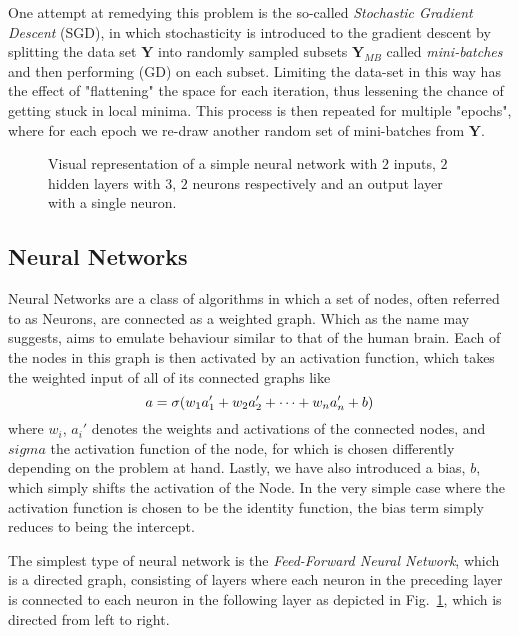 \documentclass[reprint, english, nofootinbib]{revtex4-2}
\begin{document}
One attempt at remedying this problem is the so-called \textit{Stochastic Gradient Descent} (SGD), in which stochasticity is introduced to the gradient descent by splitting the data set $\pmb Y$ into randomly sampled subsets $\pmb Y_{MB}$ called \textit{mini-batches} and then performing (GD) on each subset. Limiting the data-set in this way has the effect of "flattening" the space for each iteration, thus lessening the chance of getting stuck in local minima. This process is then repeated for multiple "epochs", where for each epoch we re-draw another random set of mini-batches from $\pmb Y$.



\begin{figure}[h!tb]
    \center
    \vspace{5mm} %
    
    \caption{\label{fig: NN Fig} Visual representation of a simple neural network with $2$ inputs, $2$ hidden layers with $3$, $2$ neurons respectively and an output layer with a single neuron.}
\end{figure}

\subsection{Neural Networks}
\noindent
Neural Networks are a class of algorithms in which a set of nodes, often referred to as Neurons, are connected as a weighted graph. Which as the name may suggests, aims to emulate behaviour similar to that of the human brain. Each of the nodes in this graph is then activated by an activation function, which takes the weighted input of all of its connected graphs like
\begin{equation}
    a = \sigma\qty(w_1 a_1' + w_2 a_2' + \dots + w_n a_n' + b)
\end{equation}
where $w_i$, $a_i'$ denotes the weights and activations of the connected nodes, and $sigma$ the activation function of the node, for which is chosen differently depending on the problem at hand. Lastly, we have also introduced a bias, $b$, which simply shifts the activation of the Node. In the very simple case where the activation function is chosen to be the identity function, the bias term simply reduces to being the intercept.

The simplest type of neural network is the \textit{Feed-Forward Neural Network}, which is a directed graph, consisting of layers where each neuron in the preceding layer is connected to each neuron in the following layer as depicted in Fig.~\ref{fig: NN Fig}, which is directed from left to right.
\end{document}
